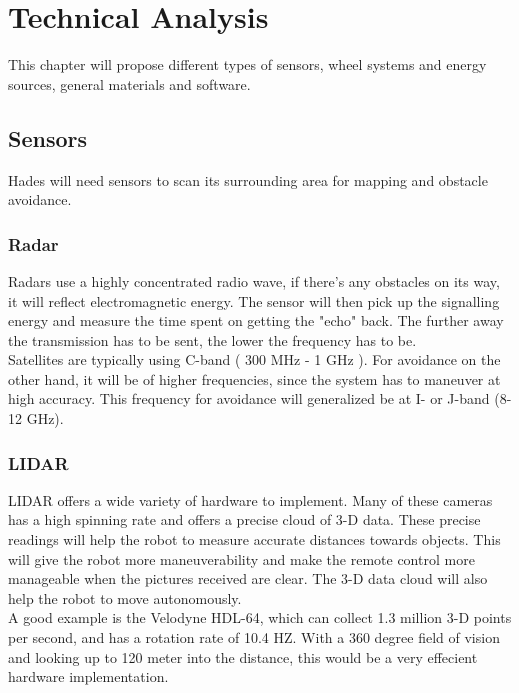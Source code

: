 \chapter{Technical Analysis}\label{ch:solutionProposal}
This chapter will propose different types of sensors, wheel systems and energy sources, general materials and software.

\section{Sensors}
Hades will need sensors to scan its surrounding area for mapping and obstacle avoidance.

\subsection{Radar}
Radars use a highly concentrated radio wave, if there's any obstacles on its way, it will reflect electromagnetic energy. The sensor will then pick up the signalling energy and measure the time spent on getting the "echo" back\cite{Radar}.
The further away the transmission has to be sent, the lower the frequency has to be.\\
Satellites are typically using C-band ( 300 MHz - 1 GHz ). 
For avoidance on the other hand, it will be of higher frequencies, since the system has to maneuver at high accuracy. This frequency for avoidance will generalized be at I- or J-band (8-12 GHz)\cite{RadarTutorial}.



\subsection{LIDAR}
LIDAR offers a wide variety of hardware to implement. Many of these cameras has a high spinning rate and offers a precise cloud of 3-D data. These precise readings will help the robot to measure accurate distances towards objects. This will give the robot more maneuverability and make the remote control more manageable when the pictures received are clear. The 3-D data cloud will also help the robot to move autonomously.\\
A good example is the Velodyne HDL-64, which can collect 1.3 million 3-D points per second, and has a rotation rate of 10.4 HZ. With a 360 degree field of vision and looking up to 120 meter into the distance, this would be a very effecient hardware implementation. \cite{Lidar360}

